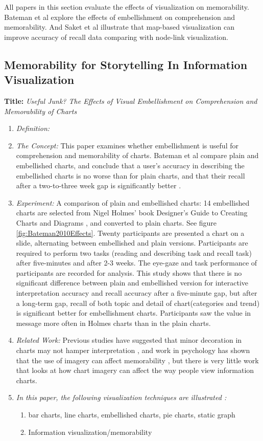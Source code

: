 \documentclass{egpubl}
\begin{document}
All papers in this section evaluate the effects of visualization on memorability. Bateman et al \cite{bateman} explore the effects of embellishment on comprehension and memorability. And Saket et al \cite{saket2015} illustrate that map-based visualization can improve accuracy of recall data comparing with node-link visualization.


\subsection{Memorability for Storytelling In Information Visualization}
\textbf{Title:} \textit{Useful Junk? The Effects of Visual Embellishment on Comprehension and Memorability of Charts}
\begin{enumerate}
\item \textit{Definition:} 
\item \textit{The Concept:} This paper examines whether embellishment is useful for comprehension and memorability of charts. Bateman et al compare plain and embellished charts, and conclude that a user's accuracy in describing the embellished charts is no worse than for plain charts, and that their recall after a two-to-three week gap is significantly better \cite{bateman}. 
\item \textit{Experiment:} A comparison of plain and embellished charts: 14 embellished charts are selected from Nigel Holmes' book Designer's Guide to Creating 
Charts and Diagrams \cite{holmes}, and converted to plain charts. See figure \ref{fig:Bateman2010Effects}. Twenty participants are presented a chart on a slide, alternating between embellished and plain versions. Participants are required to perform two tasks (reading and describing task and recall task) after five-minutes and after 2-3 weeks. The eye-gaze and task performance of participants are recorded for analysis. This study shows that there is no significant difference between plain and embellished version for interactive interpretation accuracy and recall accuracy after a five-minute gap,
but after a long-term gap, recall of both topic and detail of chart(categories and trend) is significant better for embellishment charts. Participants saw the value in message more often in Holmes charts than in the plain charts.

\item \textit{Related Work:}  Previous studies have suggested that minor decoration in charts may not hamper interpretation \cite{Blasio}, and work in psychology has shown that the use of imagery can affect memorability \cite{gambrell}, but there is very little work that looks at how chart imagery can affect the way people view information charts. 
\item \textit{In this paper, the following visualization techniques are illustrated :} 
\begin{enumerate}
\item bar charts, line charts, embellished charts, pie charts, static graph
\item Information visualization/memorability
\end{enumerate}
\end{enumerate}
\end{document}
